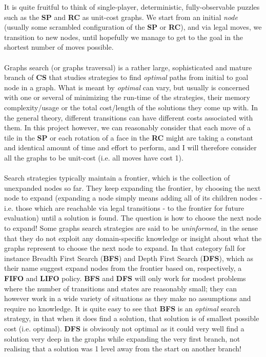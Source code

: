 It is quite fruitful to think of single-player, deterministic, fully-observable puzzles such as the \textbf{SP} and \textbf{RC} as unit-cost graphs. We start from an initial \textit{node} (usually some scrambled configuration of the \textbf{SP} or \textbf{RC}), and via legal moves, we transition to new nodes, until hopefully we manage to get to the goal in the shortest number of moves possible. 
\\
\\
Graphs search (or graphs traversal) is a rather large, sophisticated and mature branch of \textbf{CS} that studies strategies to find \textit{optimal} paths from initial to goal node in a graph. What is meant by \textit{optimal} can vary, but usually is concerned with one or several of minimizing the run-time of the strategies, their memory complexity/usage or the total cost/length of the solutions they come up with. In the general theory, different transitions can have different costs associated with them. In this project however, we can reasonably consider that each move of a tile in the \textbf{SP} or each rotation of a face in the \textbf{RC} might are taking a constant and identical amount of time and effort to perform, and I will therefore consider all the graphs to be unit-cost (i.e. all moves have cost 1).
\\
\\
Search strategies typically maintain a frontier, which is the collection of unexpanded nodes so far. They keep expanding the frontier, by choosing the next node to expand (expanding a node simply means adding all of its children nodes - i.e. those which are reachable via legal transitions - to the frontier for future evaluation) until a solution is found. The question is how to choose the next node to expand! Some graphs search strategies are said to be \textit{uninformed}, in the sense that they do not exploit any domain-specific knowledge or insight about what the graphs represent to choose the next node to expand. In that category fall for instance Breadth First Search (\textbf{BFS}) and Depth First Search (\textbf{DFS}), which as their name suggest expand nodes from the frontier based on, respectively, a \textbf{FIFO} and \textbf{LIFO} policy. \textbf{BFS} and \textbf{DFS} will only work for modest problems where the number of transitions and states are reasonably small; they can however work in a wide variety of situations as they make no assumptions and require no knowledge. It is quite easy to see that \textbf{BFS} is an \textit{optimal} search strategy, in that when it does find a solution, that solution is of smallest possible cost (i.e. optimal). \textbf{DFS} is obvisouly not optimal as it could very well find a solution very deep in the graphs while expanding the very first branch, not realising that a solution was 1 level away from the start on another branch!
